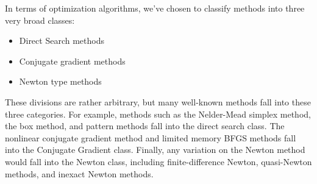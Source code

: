 In terms of optimization algorithms, we've chosen to classify methods
into three very broad classes:

\begin{itemize}
\item Direct Search methods
\item Conjugate gradient methods
\item Newton type methods
\end{itemize}

These divisions are rather arbitrary, but many well-known methods fall
into these three categories.  For example, methods such as the
Nelder-Mead simplex method, the box method, and pattern methods fall
into the direct search class. The nonlinear conjugate gradient method
and limited memory BFGS methods fall into the Conjugate Gradient
class. Finally, any variation on the Newton method would fall into the
Newton class, including finite-difference Newton, quasi-Newton
methods, and inexact Newton methods.
